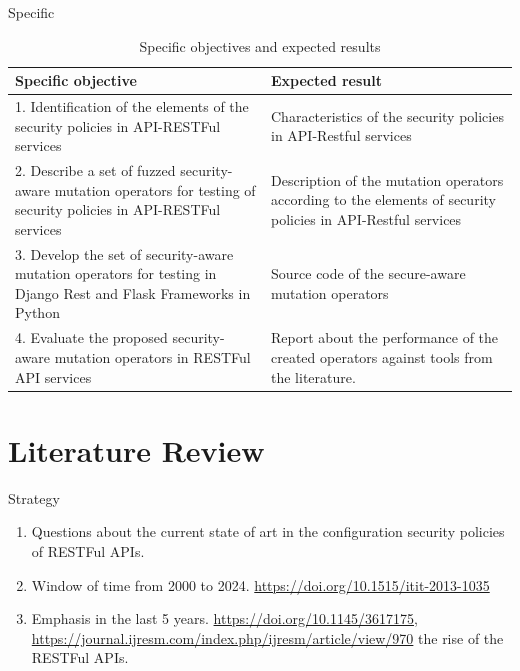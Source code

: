 \documentclass[10pt]{beamer}
\theoremstyle{remark}
\theoremstyle{definition}
\begin{document}
\begin{frame}{Specific}

\begin{table}[H]
    \centering
    \begin{tabular}{|p{}|p{}|}
        \hline
         \textbf{Specific objective} & \textbf{Expected result} \\ \hline
         1.  Identification of the elements of the security policies in API-RESTFul services &  Characteristics of the security policies in API-Restful services  \\  \hline
         2. Describe a set of fuzzed security-aware mutation operators for testing of security policies in API-RESTFul services & Description of the mutation operators according to the elements of security policies in API-Restful services  \\  \hline
         3. Develop the set of security-aware mutation operators for testing in Django Rest and Flask Frameworks in Python    & Source code of the secure-aware mutation operators \\  \hline
         4. Evaluate the proposed security-aware mutation operators in RESTFul API services & Report about the performance of the created operators against tools from the literature.
         \\ \hline
    \end{tabular}
    \caption{Specific objectives and expected results}
    \label{tab:objetivos}
\end{table}
\end{frame}

\section{Literature Review}

\begin{frame}{Strategy}
  \begin{enumerate}
    \item Questions about the current state of art in the configuration security policies of RESTFul APIs.
    \item Window of time from 2000 to 2024. \url{https://doi.org/10.1515/itit-2013-1035}
    \item Emphasis in the last 5 years. \url{https://doi.org/10.1145/3617175}, \url{https://journal.ijresm.com/index.php/ijresm/article/view/970} the rise of the RESTFul APIs.
    \end{enumerate}
\end{frame}
\end{document}
